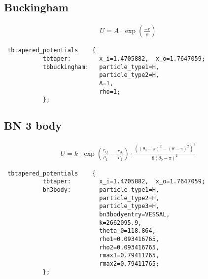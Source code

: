 \subsection{Buckingham}
\begin{align*}
U = A\cdot \exp(\frac{-r}{\rho})
\end{align*}
\begin{lstlisting}
 tbtapered_potentials    {
           tbtaper:        x_i=1.4705882,  x_o=1.7647059;
           tbbuckingham:   particle_type1=H,
                           particle_type2=H,
                           A=1,
                           rho=1;
           };
\end{lstlisting}

\subsection{BN 3 body}
\begin{align*}
U = k \cdot \exp\left(\frac{r_{ij}}{\rho_1}-\frac{r_{ik}}{\rho_2}\right)\cdot \frac{((\theta_0-\pi)^2 -(\theta-\pi)^2 )^2 }{8(\theta_0 -\pi)^2}
\end{align*}
\begin{lstlisting}
 tbtapered_potentials    {
           tbtaper:        x_i=1.4705882,  x_o=1.7647059;
           bn3body:        particle_type1=H,
                           particle_type2=H,
                           particle_type3=H,
                           bn3bodyentry=VESSAL,
                           k=2662095.9,
                           theta_0=118.864,
                           rho1=0.093416765,
                           rho2=0.093416765,
                           rmax1=0.79411765,
                           rmax2=0.79411765;
           };
\end{lstlisting}
